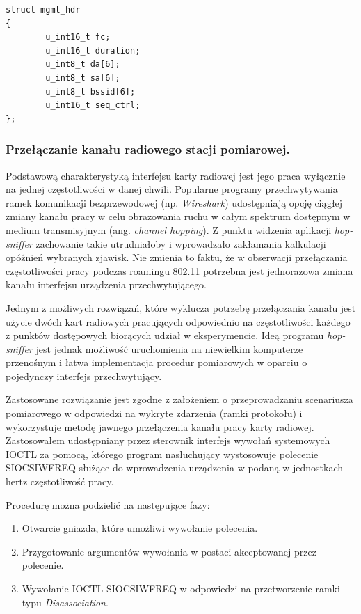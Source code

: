 \begin{lstlisting}[frame=tb]
struct mgmt_hdr
{
        u_int16_t fc;
        u_int16_t duration;
        u_int8_t da[6];
        u_int8_t sa[6];
        u_int8_t bssid[6];
        u_int16_t seq_ctrl;
};
\end{lstlisting}



\subsubsection{Przełączanie kanału radiowego stacji pomiarowej.}

Podstawową charakterystyką interfejsu karty radiowej jest jego praca wyłącznie na jednej częstotliwości w danej chwili. Popularne programy przechwytywania ramek komunikacji bezprzewodowej (np. \emph{Wireshark}) udostępniają opcję ciągłej zmiany kanału pracy w celu obrazowania ruchu w całym spektrum dostępnym w medium transmisyjnym (ang. \emph{channel hopping}). Z punktu widzenia aplikacji \emph{hop-sniffer} zachowanie takie utrudniałoby i wprowadzało zakłamania kalkulacji opóźnień wybranych zjawisk. Nie zmienia to faktu, że w obserwacji przełączania częstotliwości pracy podczas roamingu 802.11 potrzebna jest jednorazowa zmiana kanału interfejsu urządzenia przechwytującego.     

Jednym z możliwych rozwiązań, które wyklucza potrzebę przełączania kanału jest użycie dwóch kart radiowych pracujących odpowiednio na częstotliwości każdego z punktów dostępowych biorących udział w eksperymencie. Ideą programu \emph{hop-sniffer} jest jednak możliwość uruchomienia na niewielkim komputerze przenośnym i łatwa implementacja procedur pomiarowych w oparciu o pojedynczy interfejs przechwytujący. 

Zastosowane rozwiązanie jest zgodne z założeniem o przeprowadzaniu scenariusza pomiarowego w odpowiedzi na wykryte zdarzenia (ramki protokołu) i wykorzystuje metodę jawnego przełączenia kanału pracy karty radiowej. Zastosowałem udostępniany przez sterownik interfejs wywołań systemowych IOCTL za pomocą, którego program nasłuchujący wystosowuje polecenie SIOCSIWFREQ służące do wprowadzenia urządzenia w podaną w jednostkach hertz częstotliwość pracy. 

Procedurę można podzielić na następujące fazy:
\begin{enumerate}
\item Otwarcie gniazda, które umożliwi wywołanie polecenia.
\item Przygotowanie argumentów wywołania w postaci akceptowanej przez polecenie.
\item Wywołanie IOCTL SIOCSIWFREQ w odpowiedzi na przetworzenie ramki typu \emph{Disassociation}.
\end{enumerate}

